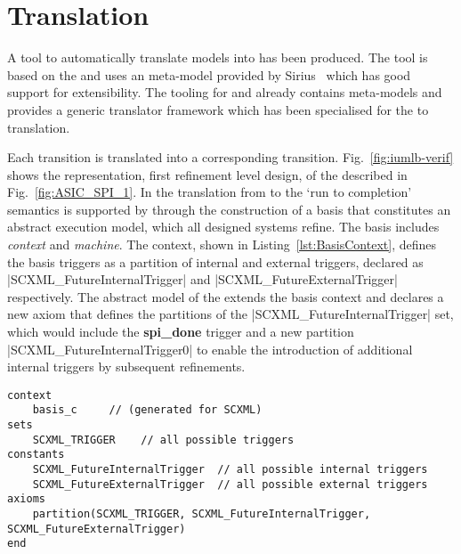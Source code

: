 
\section{\SCXML Translation}
\label{sec:translation}

A tool to automatically translate \SCXML models into \iUMLB has been produced. 
The tool is based on the \EMF and uses an \SCXML meta-model provided by Sirius~\cite{siriuswebsite} which has good support for extensibility. 
The tooling for \iUMLB and \EventB already contains \EMF meta-models and provides a generic translator framework which has been specialised for the \SCXML to \iUMLB translation. 

Each \SCXML transition is translated into a corresponding \iUMLB transition. 
Fig.~\ref{fig:iumlb-verif} shows the \iUMLB representation, first refinement level design, of the \IDS described in
Fig.~\ref{fig:ASIC_SPI_1}. 
In the translation from \iUMLB to \EventB the `run to completion' semantics is supported by \EventB through the construction of a basis that constitutes an abstract execution model, which all designed systems refine. 
The basis includes \EventB \emph{context} and \emph{machine}. 
The context, shown in Listing~\ref{lst:BasisContext}, defines the basis triggers as a partition of internal and external triggers, declared as |SCXML_FutureInternalTrigger| and |SCXML_FutureExternalTrigger| respectively. 
The abstract model of the \IDS extends the basis context and declares a new axiom that defines the partitions of the |SCXML_FutureInternalTrigger| set, which would include the \textbf{spi\_done} trigger and a new partition |SCXML_FutureInternalTrigger0| to enable the introduction of additional internal triggers by subsequent refinements. 

\begin{lstlisting}[caption={Abstract basis context},label={lst:BasisContext}, language=Event-B, escapechar=|, frame=single, basicstyle=\rmfamily\scriptsize]
context
	basis_c 	// (generated for SCXML)
sets
	SCXML_TRIGGER	 // all possible triggers
constants
	SCXML_FutureInternalTrigger	 // all possible internal triggers
	SCXML_FutureExternalTrigger	 // all possible external triggers  
axioms
	partition(SCXML_TRIGGER, SCXML_FutureInternalTrigger, SCXML_FutureExternalTrigger) 
end
\end{lstlisting}	


